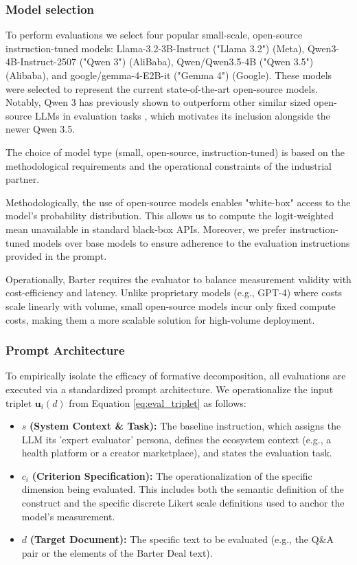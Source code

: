 \subsubsection{Model selection}

To perform evaluations we select four popular small-scale, open-source instruction-tuned models: Llama-3.2-3B-Instruct ("Llama 3.2") (Meta), Qwen3-4B-Instruct-2507 ("Qwen 3") \citep{qwen3technicalreport} (AliBaba), Qwen/Qwen3.5-4B ("Qwen 3.5") (Alibaba), and google/gemma-4-E2B-it ("Gemma 4") (Google). These models were selected to represent the current state-of-the-art open-source models. Notably, Qwen 3 has previously shown to outperform other similar sized open-source LLMs in evaluation tasks \citep{gu_survey_2025}, which motivates its inclusion alongside the newer Qwen 3.5.

The choice of model type (small, open-source, instruction-tuned) is based on the methodological requirements and the operational constraints of the industrial partner. 


Methodologically, the use of open-source models enables "white-box" access to the model's probability distribution. This allows us to compute the logit-weighted mean unavailable in standard black-box APIs. Moreover, we prefer instruction-tuned models over base models to ensure adherence to the evaluation instructions provided in the prompt. 

Operationally, Barter requires the evaluator to balance measurement validity with cost-efficiency and latency. Unlike proprietary models (e.g., GPT-4) where costs scale linearly with volume, small open-source models incur only fixed compute costs, making them a more scalable solution for high-volume deployment. 


\subsubsection{Prompt Architecture} 

To empirically isolate the efficacy of formative decomposition, all evaluations are executed via a standardized prompt architecture. We operationalize the input triplet $\mathbf{u}_i(d)$ from Equation \ref{eq:eval_triplet} as follows:

\begin{itemize}
    \item $s$ \textbf{(System Context \& Task):} The baseline instruction, which assigns the LLM its 'expert evaluator' persona, defines the ecosystem context (e.g., a health platform or a creator marketplace), and states the evaluation task.
    \item $c_i$ \textbf{(Criterion Specification):} The operationalization of the specific dimension being evaluated. This includes both the semantic definition of the construct and the specific discrete Likert scale definitions used to anchor the model's measurement.
    \item $d$ \textbf{(Target Document):} The specific text to be evaluated (e.g., the Q\&A pair or the elements of the Barter Deal text).
\end{itemize}

